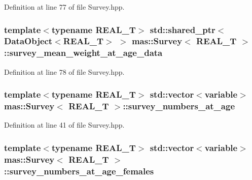 Definition at line 77 of file Survey.\-hpp.

\hypertarget{structmas_1_1_survey_ad01d8e1c386d36f34c352238f78f4ead}{
\subsubsection[{survey\-\_\-mean\-\_\-weight\-\_\-at\-\_\-age\-\_\-data}]{\setlength{\rightskip}{0pt plus 5cm}template$<$typename R\-E\-A\-L\-\_\-\-T$>$ std\-::shared\-\_\-ptr$<${\bf Data\-Object}$<$R\-E\-A\-L\-\_\-\-T$>$ $>$ {\bf mas\-::\-Survey}$<$ R\-E\-A\-L\-\_\-\-T $>$\-::survey\-\_\-mean\-\_\-weight\-\_\-at\-\_\-age\-\_\-data}}\label{structmas_1_1_survey_ad01d8e1c386d36f34c352238f78f4ead}


Definition at line 78 of file Survey.\-hpp.

\hypertarget{structmas_1_1_survey_a84b8d86778e01e5deae1b89b21dd9101}{
\subsubsection[{survey\-\_\-numbers\-\_\-at\-\_\-age}]{\setlength{\rightskip}{0pt plus 5cm}template$<$typename R\-E\-A\-L\-\_\-\-T$>$ std\-::vector$<${\bf variable}$>$ {\bf mas\-::\-Survey}$<$ R\-E\-A\-L\-\_\-\-T $>$\-::survey\-\_\-numbers\-\_\-at\-\_\-age}}\label{structmas_1_1_survey_a84b8d86778e01e5deae1b89b21dd9101}


Definition at line 41 of file Survey.\-hpp.

\hypertarget{structmas_1_1_survey_ab098ff5aa484ec1564b4dbaf9c9df95c}{
\subsubsection[{survey\-\_\-numbers\-\_\-at\-\_\-age\-\_\-females}]{\setlength{\rightskip}{0pt plus 5cm}template$<$typename R\-E\-A\-L\-\_\-\-T$>$ std\-::vector$<${\bf variable}$>$ {\bf mas\-::\-Survey}$<$ R\-E\-A\-L\-\_\-\-T $>$\-::survey\-\_\-numbers\-\_\-at\-\_\-age\-\_\-females}}\label{structmas_1_1_survey_ab098ff5aa484ec1564b4dbaf9c9df95c}



